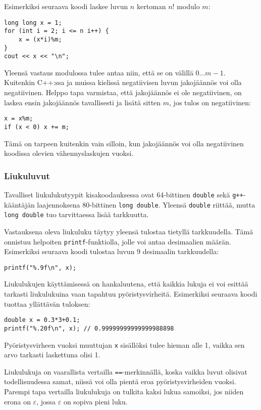 Esimerkiksi seuraava koodi
laskee luvun $n$ kertoman $n!$ modulo $m$:
\begin{lstlisting}
long long x = 1;
for (int i = 2; i <= n i++) {
    x = (x*i)%m;
}
cout << x << "\n";
\end{lstlisting}

Yleensä vastaus modulossa tulee antaa niin,
että se on välillä $0\ldots m-1$.
Kuitenkin C++:ssa ja
muissa kielissä negatiivisen
luvun jakojäännös voi olla negatiivinen.
Helppo tapa varmistaa, että jakojäännös ei ole negatiivinen,
on laskea ensin jakojäännös tavallisesti ja lisätä sitten $m$,
jos tulos on negatiivinen:
\begin{lstlisting}
x = x%m;
if (x < 0) x += m;
\end{lstlisting}
Tämä on tarpeen kuitenkin vain silloin,
kun jakojäännös voi olla negatiivinen
koodissa olevien vähennyslaskujen vuoksi.

\subsubsection{Liukuluvut}


Tavalliset liukulukutyypit kisakoodauksessa
ovat 64-bittinen \texttt{double}
sekä \texttt{g++}-kääntäjän
laajennoksena
80-bittinen \texttt{long double}.
Yleensä \texttt{double} riittää,
mutta \texttt{long double} tuo tarvittaessa
lisää tarkkuutta.

Vastauksena oleva liukuluku täytyy yleensä tulostaa
tietyllä tarkkuudella.
Tämä onnistuu helpoiten \texttt{printf}-funktiolla,
jolle voi antaa desimaalien määrän.
Esimerkiksi seuraava koodi tulostaa luvun 9
desimaalin tarkkuudella:

\begin{lstlisting}
printf("%.9f\n", x);
\end{lstlisting}

Liukulukujen käyttämisessä on hankaluutena,
että kaikkia lukuja ei voi esittää tarkasti
liukulukuina vaan tapahtuu pyöristysvirheitä.
Esimerkiksi seuraava koodi tuottaa yllättävän tuloksen:

\begin{lstlisting}
double x = 0.3*3+0.1;
printf("%.20f\n", x); // 0.99999999999999988898
\end{lstlisting}

Pyöristysvirheen vuoksi muuttujan \texttt{x}
sisällöksi tulee hieman alle 1,
vaikka sen arvo tarkasti laskettuna olisi 1.

Liukulukuja on vaarallista vertailla \texttt{==}-merkinnällä,
koska vaikka luvut olisivat todellisuudessa samat,
niissä voi olla pientä eroa pyöristysvirheiden vuoksi.
Parempi tapa vertailla liukulukuja on
tulkita kaksi lukua samoiksi, jos niiden erona on $\varepsilon$,
jossa $\varepsilon$ on sopiva pieni luku.

